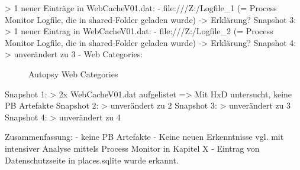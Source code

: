 		> 1 neuer Einträge in WebCacheV01.dat:
			- file:///Z:/Logfile\_1 (= Process Monitor Logfile, die in shared-Folder geladen wurde) -> Erklärung?
	Snapshot 3:
		> 1 neuer Eintrag in WebCacheV01.dat:
			- file:///Z:/Logfile\_2 (= Process Monitor Logfile, die in shared-Folder geladen wurde) -> Erklärung?
	Snapshot 4:
		> unverändert zu 3
- Web Categories:
	\begin{figure}[h!]
		\centerline{}
		\label{chart:final-criteria}  
		\caption{Autopsy Web Categories}
	\end{figure}
	Snapshot 1:
		> 2x WebCacheV01.dat aufgelistet => Mit HxD untersucht, keine PB Artefakte
	Snapshot 2:
		> unverändert zu 2
	Snapshot 3:
		> unverändert zu 3
	Snapshot 4:
		> unverändert zu 4
		
Zusammenfassung:
- keine PB Artefakte
- Keine neuen Erkenntnisse vgl. mit intensiver Analyse mittels Process Monitor in Kapitel X
- Eintrag von Datenschutzseite in places.sqlite wurde erkannt.


